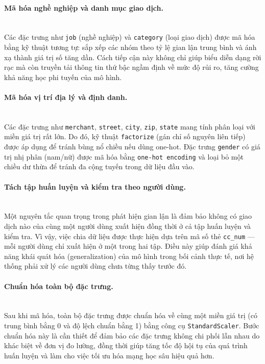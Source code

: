 \paragraph{Mã hóa nghề nghiệp và danh mục giao dịch.}
\mbox{}\\
Các đặc trưng như \texttt{job} (nghề nghiệp) và \texttt{category} (loại giao dịch) được mã hóa bằng kỹ thuật tương tự: sắp xếp các nhóm theo tỷ lệ gian lận trung bình và ánh xạ thành giá trị số tăng dần. Cách tiếp cận này không chỉ giúp biểu diễn dạng rời rạc mà còn truyền tải thông tin thứ bậc ngầm định về mức độ rủi ro, tăng cường khả năng học phi tuyến của mô hình.

\paragraph{Mã hóa vị trí địa lý và định danh.} 
\mbox{}\\
Các đặc trưng như \texttt{merchant}, \texttt{street}, \texttt{city}, \texttt{zip}, \texttt{state} mang tính phân loại với miền giá trị rất lớn. Do đó, kỹ thuật \texttt{factorize} (gán chỉ số nguyên liên tiếp) được áp dụng để tránh bùng nổ chiều nếu dùng one-hot. Đặc trưng \texttt{gender} có giá trị nhị phân (nam/nữ) được mã hóa bằng \texttt{one-hot encoding} và loại bỏ một chiều dư thừa để tránh đa cộng tuyến trong dữ liệu đầu vào.

\paragraph{Tách tập huấn luyện và kiểm tra theo người dùng.} 
\mbox{}\\
Một nguyên tắc quan trọng trong phát hiện gian lận là đảm bảo không có giao dịch nào của cùng một người dùng xuất hiện đồng thời ở cả tập huấn luyện và kiểm tra. Vì vậy, việc chia dữ liệu được thực hiện dựa trên mã số thẻ \texttt{cc\_num} — mỗi người dùng chỉ xuất hiện ở một trong hai tập. Điều này giúp đánh giá khả năng khái quát hóa (generalization) của mô hình trong bối cảnh thực tế, nơi hệ thống phải xử lý các người dùng chưa từng thấy trước đó.

\paragraph{Chuẩn hóa toàn bộ đặc trưng.} 
\mbox{}\\
Sau khi mã hóa, toàn bộ đặc trưng được chuẩn hóa về cùng một miền giá trị (có trung bình bằng 0 và độ lệch chuẩn bằng 1) bằng công cụ \texttt{StandardScaler}. Bước chuẩn hóa này là cần thiết để đảm bảo các đặc trưng không chi phối lẫn nhau do khác biệt về đơn vị đo lường, đồng thời giúp tăng tốc độ hội tụ của quá trình huấn luyện và làm cho việc tối ưu hóa mạng học sâu hiệu quả hơn.


